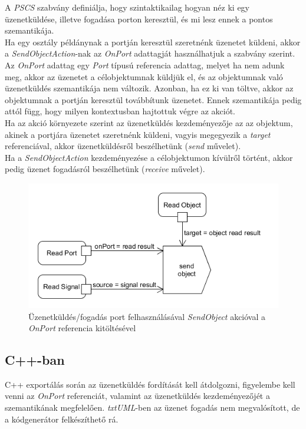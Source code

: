 \documentclass[a4paper,12pt]{report}
\begin{document}
A \textit{PSCS} szabvány definiálja, hogy szintaktikailag hogyan néz ki egy üzenetküldése, illetve fogadása porton keresztül, és mi lesz ennek a pontos szemantikája. \\
Ha egy osztály példánynak a portján keresztül szeretnénk üzenetet küldeni, akkor a \textit{SendObjectAction}-nak az \textit{OnPort} adattagját használhatjuk a szabvány szerint.  Az \textit{OnPort} adattag egy \textit{Port} típusú referencia adattag, melyet ha nem adunk meg, akkor az üzenetet a célobjektumnak küldjük el, és az objektumnak való üzenetküldés szemantikája nem változik.  Azonban, ha ez ki van töltve, akkor az objektumnak a portján keresztül továbbítunk üzenetet. Ennek szemantikája pedig attól függ, hogy milyen kontextusban hajtottuk végre az akciót. \\

Ha az akció környezete szerint az üzenetküldés kezdeményezője az az objektum, akinek a portjára üzenetet szeretnénk küldeni, vagyis megegyezik a \textit{target} referenciával, akkor üzenetküldésről beszélhetünk (\textit{send} művelet). \\
Ha a \textit{SendObjectAction} kezdeményezése a célobjektumon kívülről történt, akkor pedig üzenet fogadásról beszélhetünk (\textit{receive} művelet). \\
 
\begin{figure}[H]
\begin{center}
\includegraphics[scale=0.7]{receive_uml.png}
\end{center}
\caption{Üzenetküldés/fogadás port felhasználásával \textit{SendObject} akcióval a \textit{OnPort} referencia kitöltésével}
\end{figure} 

\subsection{C++-ban}
C++ exportálás során az üzenetküldés fordítását kell átdolgozni, figyelembe kell venni az \textit{OnPort} referenciát, valamint az üzenetküldés kezdeményezőjét a szemantikának megfelelően. \textit{txtUML}-ben az üzenet fogadás nem megvalósított, de a kódgenerátor felkészíthető rá.
\end{document}
